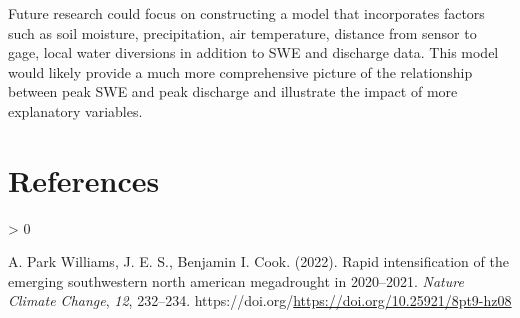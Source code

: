 \documentclass[
  12pt,
]{article}
\newlength{\cslhangindent}
\newenvironment{CSLReferences}[2] %
 {%
  \setlength{\parindent}{0pt}
  \ifodd #1 \everypar{\setlength{\hangindent}{\cslhangindent}}\ignorespaces\fi
  \ifnum #2 > 0
  \setlength{\parskip}{#2\baselineskip}
  \fi
 }%
 {}
\begin{document}
Future research could focus on constructing a model that incorporates
factors such as soil moisture, precipitation, air temperature, distance
from sensor to gage, local water diversions in addition to SWE and
discharge data. This model would likely provide a much more
comprehensive picture of the relationship between peak SWE and peak
discharge and illustrate the impact of more explanatory variables.

\newpage

\hypertarget{references}{%
\section*{References}\label{references}}

\hypertarget{refs}{}
\begin{CSLReferences}{1}{0}
\leavevmode\hypertarget{ref-WILLIAMS2022232}{}%
A. Park Williams, J. E. S., Benjamin I. Cook. (2022). Rapid
intensification of the emerging southwestern north american megadrought
in 2020--2021. \emph{Nature Climate Change}, \emph{12}, 232--234.
https://doi.org/\url{https://doi.org/10.25921/8pt9-hz08}

\end{CSLReferences}
\end{document}
